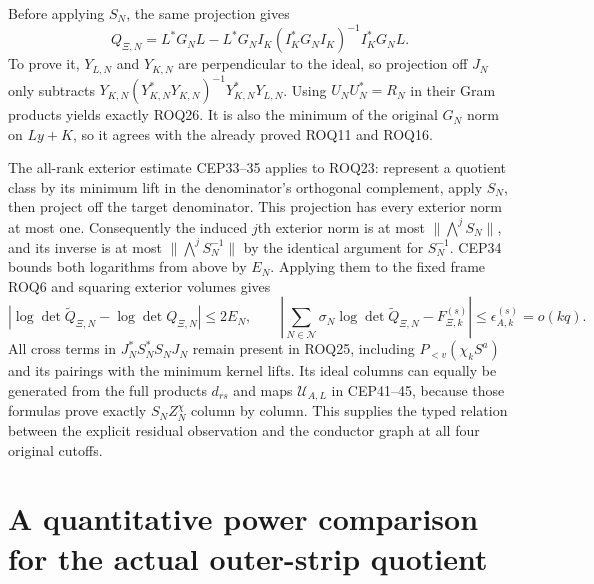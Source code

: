 \documentclass[11pt,a4paper]{article}
\begin{document}
Before applying $S_N$, the same projection gives
\[
 Q_{\Xi,N}
 =L^*G_NL-L^*G_NI_K(I_K^*G_NI_K)^{-1}I_K^*G_NL.
 \tag{ROQ26}
\]
To prove it, $Y_{L,N}$ and $Y_{K,N}$ are perpendicular to the ideal,
so projection off $J_N$ only subtracts
$Y_{K,N}(Y_{K,N}^*Y_{K,N})^{-1}Y_{K,N}^*Y_{L,N}$.
Using $U_NU_N^*=R_N$ in their Gram products yields exactly ROQ26.
It is also the minimum of the original $G_N$ norm on $Ly+K$, so
it agrees with the already proved ROQ11 and ROQ16.

The all-rank exterior estimate CEP33--35 applies to ROQ23: represent
a quotient class by its minimum lift in the denominator's orthogonal
complement, apply $S_N$, then project off the target denominator.
This projection has every exterior norm at most one. Consequently the
induced $j$th exterior norm is at most $\|\bigwedge^jS_N\|$, and its
inverse is at most $\|\bigwedge^jS_N^{-1}\|$ by the identical argument
for $S_N^{-1}$. CEP34 bounds both logarithms from above by $E_N$.
Applying them to the fixed frame ROQ6 and squaring exterior volumes gives
\[
 \left|\log\det\widetilde Q_{\Xi,N}
                -\log\det Q_{\Xi,N}\right|\le2E_N,\qquad
 \left|\sum_{N\in\mathcal N}\sigma_N\log\det\widetilde Q_{\Xi,N}
                       -F_{\Xi,k}^{(s)}\right|
                       \le\epsilon_{A,k}^{(s)}=o(kq).
 \tag{ROQ27}
\]
All cross terms in $J_N^*S_N^*S_NJ_N$ remain present in ROQ25,
including $P_{<v}(\chi_k S^a)$ and its pairings with the minimum
kernel lifts. Its ideal columns can equally be generated from the full
products $d_{rs}$ and maps $\mathcal U_{A,L}$ in CEP41--45, because
those formulas prove exactly $S_NZ_N^{\chi}$ column by column.
This supplies the typed relation between the explicit residual
observation and the conductor graph at all four original cutoffs.


\clearpage
\section{A quantitative power comparison for the actual outer-strip quotient}
\label{sec:OSP}
\end{document}
